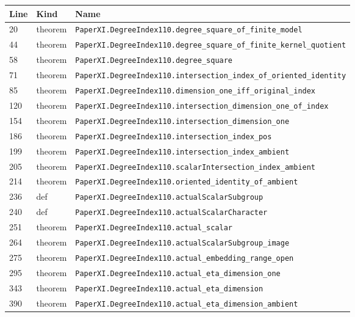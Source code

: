 \documentclass[10pt,oneside]{book}
\begin{document}
\begin{longtable}{@{}p{}p{}p{}@{}}\toprule Line&Kind&Name\\\midrule\endhead

20&theorem&\nolinkurl{PaperXI.DegreeIndex110.degree_square_of_finite_model}\\

44&theorem&\nolinkurl{PaperXI.DegreeIndex110.degree_square_of_finite_kernel_quotient}\\

58&theorem&\nolinkurl{PaperXI.DegreeIndex110.degree_square}\\

71&theorem&\nolinkurl{PaperXI.DegreeIndex110.intersection_index_of_oriented_identity}\\

85&theorem&\nolinkurl{PaperXI.DegreeIndex110.dimension_one_iff_original_index}\\

120&theorem&\nolinkurl{PaperXI.DegreeIndex110.intersection_dimension_one_of_index}\\

154&theorem&\nolinkurl{PaperXI.DegreeIndex110.intersection_dimension_one}\\

186&theorem&\nolinkurl{PaperXI.DegreeIndex110.intersection_index_pos}\\

199&theorem&\nolinkurl{PaperXI.DegreeIndex110.intersection_index_ambient}\\

205&theorem&\nolinkurl{PaperXI.DegreeIndex110.scalarIntersection_index_ambient}\\

214&theorem&\nolinkurl{PaperXI.DegreeIndex110.oriented_identity_of_ambient}\\

236&def&\nolinkurl{PaperXI.DegreeIndex110.actualScalarSubgroup}\\

240&def&\nolinkurl{PaperXI.DegreeIndex110.actualScalarCharacter}\\

251&theorem&\nolinkurl{PaperXI.DegreeIndex110.actual_scalar}\\

264&theorem&\nolinkurl{PaperXI.DegreeIndex110.actualScalarSubgroup_image}\\

275&theorem&\nolinkurl{PaperXI.DegreeIndex110.actual_embedding_range_open}\\

295&theorem&\nolinkurl{PaperXI.DegreeIndex110.actual_eta_dimension_one}\\

343&theorem&\nolinkurl{PaperXI.DegreeIndex110.actual_eta_dimension}\\

390&theorem&\nolinkurl{PaperXI.DegreeIndex110.actual_eta_dimension_ambient}\\

\bottomrule\end{longtable}
\end{document}
